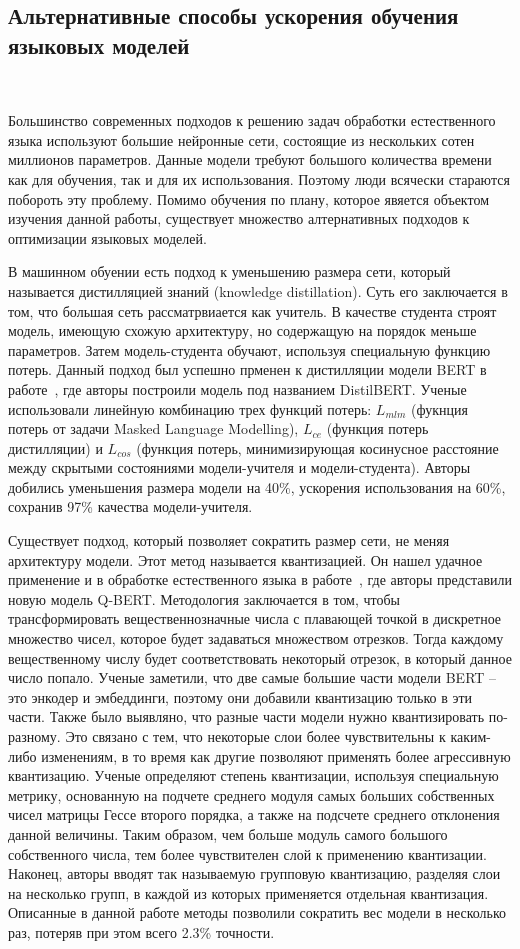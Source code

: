 \documentclass{spbau-diploma}
\begin{document}
\subsection{Альтернативные способы ускорения обучения языковых моделей}
\ 

Большинство современных подходов к решению задач обработки естественного языка используют большие нейронные сети, состоящие из нескольких сотен миллионов параметров. Данные модели требуют большого количества времени как для обучения, так и для их использования. Поэтому люди всячески стараются побороть эту проблему. Помимо обучения по плану, которое явяется объектом изучения данной работы, существует множество алтернативных подходов к оптимизации языковых моделей.

В машинном обуении есть подход к уменьшению размера сети, который называется дистилляцией знаний (knowledge distillation). Суть его заключается в том, что большая сеть рассматрвиается как учитель. В качестве студента строят модель, имеющую схожую архитектуру, но содержащую на порядок меньше параметров. Затем модель-студента обучают, используя специальную функцию потерь. Данный подход был успешно прменен к дистилляции модели BERT в работе~\cite{sanh2019distilbert}, где авторы построили модель под названием DistilBERT. Ученые использовали линейную комбинацию трех функций потерь: $L_{mlm}$ (фукнция потерь от задачи Masked Language Modelling), $L_{ce}$ (функция потерь дистилляции) и $L_{cos}$ (функция потерь, минимизирующая косинусное расстояние между скрытыми состояниями модели-учителя и модели-студента). Авторы добились уменьшения размера модели на 40\%, ускорения использования на 60\%, сохранив 97\% качества модели-учителя.

Существует подход, который позволяет сократить размер сети, не меняя архитектуру модели. Этот метод называется квантизацией. Он нашел удачное применение и в обработке естественного языка в работе~\cite{shen2020q}, где авторы представили новую модель Q-BERT. Методология заключается в том, чтобы трансформировать вещественнозначные числа с плавающей точкой в дискретное множество чисел, которое будет задаваться множеством отрезков. Тогда каждому вещественному числу будет соответствовать некоторый отрезок, в который данное число попало. Ученые заметили, что две самые большие части модели BERT -- это энкодер и эмбеддинги, поэтому они добавили квантизацию только в эти части. Также было выявляно, что разные части модели нужно квантизировать по-разному. Это связано с тем, что некоторые слои более чувствительны к каким-либо изменениям, в то время как другие позволяют применять более агрессивную квантизацию. Ученые определяют степень квантизации, используя специальную метрику, основанную на подчете среднего модуля самых больших собственных чисел матрицы Гессе второго порядка, а также на подсчете среднего отклонения данной величины. Таким образом, чем больше модуль самого большого собственного числа, тем более чувствителен слой к применению квантизации. Наконец, авторы вводят так называемую групповую квантизацию, разделяя слои на несколько групп, в каждой из которых применяется отдельная квантизация. Описанные в данной работе методы позволили сократить вес модели в несколько раз, потеряв при этом всего 2.3\% точности.
\end{document}
